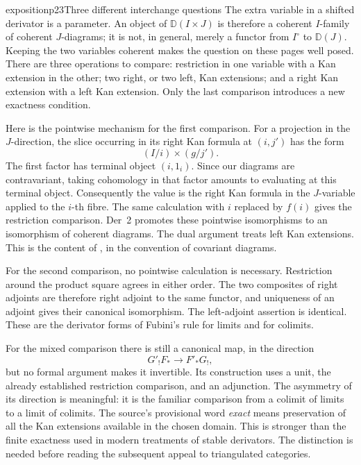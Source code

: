 \begin{dcomment}{exposition}{p23}{Three different interchange questions}
The extra variable in a shifted derivator is a parameter. An object of
$\mathbb D(I\times J)$ is therefore a coherent $I$-family of coherent
$J$-diagrams; it is not, in general, merely a functor from $I^{\circ}$ to
$\mathbb D(J)$. Keeping the two variables coherent makes the question on these
pages well posed. There are three operations to compare: restriction in one
variable with a Kan extension in the other; two right, or two left, Kan
extensions; and a right Kan extension with a left Kan extension. Only the last
comparison introduces a new exactness condition.

Here is the pointwise mechanism for the first comparison. For a projection
in the $J$-direction, the slice occurring in its right Kan formula at
$(i,j')$ has the form
\[
 (I/i)\times(g/j').
\]
The first factor has terminal object $(i,1_i)$. Since our diagrams are
contravariant, taking cohomology in that factor amounts to evaluating at
this terminal object. Consequently the value is the right Kan formula in
the $J$-variable applied to the $i$-th fibre. The same calculation with $i$
replaced by $f(i)$ gives the restriction comparison. Der~2 promotes these
pointwise isomorphisms to an isomorphism of coherent diagrams. The dual
argument treats left Kan extensions. This is the content of
\citet[Proposition~2.5]{Groth2013}, in the convention of covariant diagrams.

For the second comparison, no pointwise calculation is necessary.
Restriction around the product square agrees in either order. The two
composites of right adjoints are therefore right adjoint to the same
functor, and uniqueness of an adjoint gives their canonical isomorphism.
The left-adjoint assertion is identical. These are the derivator forms of
Fubini's rule for limits and for colimits.

For the mixed comparison there is still a canonical map, in the direction
\[
 G'_!F_*\longrightarrow F'_*G_!,
\]
but no formal argument makes it invertible. Its construction uses a unit,
the already established restriction comparison, and an adjunction. The
asymmetry of its direction is meaningful: it is the familiar comparison
from a colimit of limits to a limit of colimits. The source's provisional
word \emph{exact} means preservation of all the Kan extensions available
in the chosen domain. This is stronger than the finite exactness used in
modern treatments of stable derivators. The distinction is needed before
reading the subsequent appeal to triangulated categories.
\end{dcomment}


